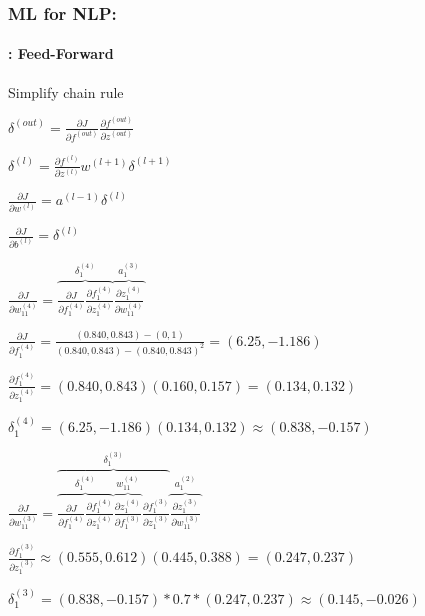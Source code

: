 \documentclass[xcolor=table]{beamer}
\begin{document}
	\begin{frame}
		\frametitle{ML for NLP: \insertsection}
		\framesubtitle{\insertsubsection: Feed-Forward}
		
		\begin{minipage}{0.3\textwidth}
			\small
			
			Simplify chain rule\boldmath
			
			$ \delta^{(out)} = \frac{\partial J}{\partial f^{(out)}} \frac{\partial f^{(out)}}{\partial z^{(out)}} $
			
			$ \delta^{(l)} = \frac{\partial f^{(l)}}{\partial z^{(l)}} w^{(l+1)} \delta^{(l+1)} $
			
			$ \frac{\partial J}{\partial w^{(l)}} = a^{(l-1)} \delta^{(l)} $
			
			$ \frac{\partial J}{\partial b^{(l)}} = \delta^{(l)} $
			
		\end{minipage}
		\begin{minipage}{0.69\textwidth} 
		\end{minipage}
		
		\begin{minipage}{0.45\textwidth} 
			\tiny
			$
			\frac{\partial J}{\partial w_{11}^{(4)}} = \overbrace{\frac{\partial J}{\partial f_{1}^{(4)}} \frac{\partial f_{1}^{(4)}}{\partial z_{1}^{(4)}}}^{\delta_{1}^{(4)}} \overbrace{\frac{\partial z_{1}^{(4)}}{\partial w_{11}^{(4)}}}^{a_{1}^{(3)}}
			$
			
			$ 
			\frac{\partial J}{\partial f_{1}^{(4)}} = \frac{(0.840, 0.843) - (0, 1)}{(0.840, 0.843) - (0.840, 0.843)^2} 
			= (6.25, -1.186)
			$
			
			$ 
			\frac{\partial f_{1}^{(4)}}{\partial z_{1}^{(4)}} = (0.840, 0.843) (0.160, 0.157) = (0.134, 0.132)
			$
			
			$
			\delta_{1}^{(4)} = (6.25, -1.186) (0.134, 0.132) \approx (0.838, -0.157)
			$ 
		\end{minipage}
		\begin{minipage}{0.54\textwidth} 
			\tiny
			$
			\frac{\partial J}{\partial w_{11}^{(3)}} = 
			\overbrace{
				\overbrace{
					\frac{\partial J}{\partial f_{1}^{(4)}} 
					\frac{\partial f_{1}^{(4)}}{\partial z_{1}^{(4)}}
				}^{\delta_{1}^{(4)}} 
				\overbrace{
					\frac{\partial z_{1}^{(4)}}{\partial f_{1}^{(3)}}
				}^{w_{11}^{(4)}} 
				\frac{\partial f_{1}^{(3)}}{\partial z_{1}^{(3)}} 
			}^{\delta_{1}^{(3)}} 
			\overbrace{
				\frac{\partial z_{1}^{(3)}}{\partial w_{11}^{(3)}}
			}^{a_{1}^{(2)}}
			$
			
			$
			\frac{\partial f_{1}^{(3)}}{\partial z_{1}^{(3)}} \approx 
			(0.555, 0.612) (0.445, 0.388) = (0.247, 0.237)
			$
			
			$
			\delta_{1}^{(3)} = (0.838, -0.157) * 0.7 * (0.247, 0.237) \approx (0.145, -0.026)
			$
		\end{minipage}
		
		
	\end{frame}
\end{document}

